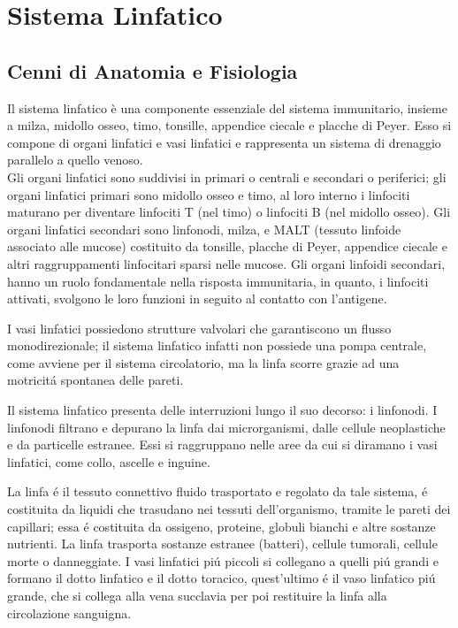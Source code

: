\chapter{Sistema Linfatico}

\section{Cenni di Anatomia e Fisiologia}
Il sistema linfatico \`e una componente essenziale del sistema immunitario, 
insieme a milza, midollo osseo, timo, tonsille, appendice ciecale e placche di Peyer. 
Esso si compone di organi linfatici e vasi linfatici e rappresenta 
un sistema di drenaggio parallelo a quello venoso.\\
Gli organi linfatici sono suddivisi in primari o centrali 
e secondari o periferici; gli organi linfatici primari sono midollo osseo 
e timo, al loro interno i linfociti maturano per diventare linfociti T (nel timo) 
o linfociti B (nel midollo osseo). 
Gli organi linfatici secondari sono linfonodi, milza, e MALT 
(tessuto linfoide associato alle mucose) costituito da tonsille, 
placche di Peyer, appendice ciecale e altri raggruppamenti linfocitari 
sparsi nelle mucose. Gli organi linfoidi secondari, hanno un ruolo fondamentale 
nella risposta immunitaria, in quanto, i linfociti attivati, svolgono le loro funzioni 
in seguito al contatto con l'antigene.

I vasi linfatici possiedono strutture valvolari che garantiscono un flusso monodirezionale; 
il sistema linfatico infatti non possiede una pompa centrale, 
come avviene per il sistema circolatorio, ma la linfa scorre grazie ad una motricit\'a spontanea delle pareti.

Il sistema linfatico presenta delle interruzioni lungo il suo decorso: i linfonodi. 
I linfonodi filtrano e depurano la linfa dai microrganismi, dalle cellule neoplastiche e 
da particelle estranee. Essi si raggruppano nelle aree da cui si diramano i vasi linfatici, 
come collo, ascelle e inguine.

La linfa \'e il tessuto connettivo fluido trasportato e regolato da tale sistema, \'e costituita 
da liquidi che trasudano nei tessuti dell'organismo, tramite le pareti dei capillari; essa \'e costituita 
da ossigeno, proteine, globuli bianchi e altre sostanze nutrienti. 
La linfa trasporta sostanze estranee (batteri), cellule tumorali, cellule morte o danneggiate. 
I vasi linfatici pi\'u piccoli si collegano a quelli pi\'u grandi e formano il dotto linfatico e il dotto 
toracico, quest'ultimo \'e il vaso linfatico pi\'u grande, che si collega alla vena succlavia per poi restituire 
la linfa alla circolazione sanguigna. 

